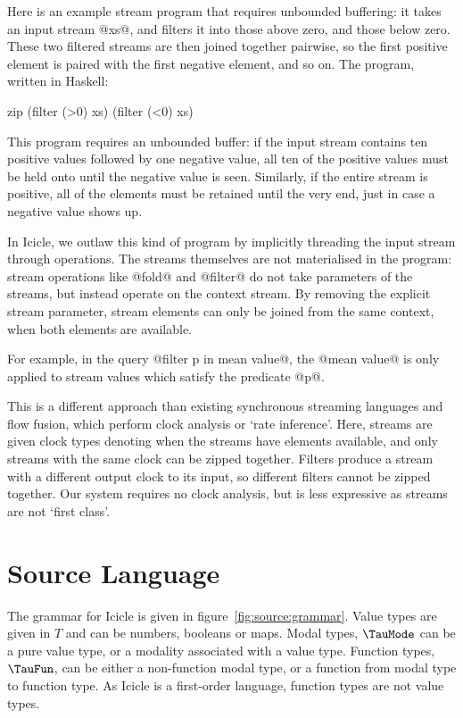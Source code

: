 Here is an example stream program that requires unbounded buffering:
it takes an input stream @xs@, and filters it into those above zero, and those below zero.
These two filtered streams are then joined together pairwise, so the first positive element is paired with the first negative element, and so on.
The program, written in Haskell:

\begin{code}
zip (filter (>0) xs) (filter (<0) xs)
\end{code}

This program requires an unbounded buffer: if the input stream contains ten positive values followed by one negative value, all ten of the positive values must be held onto until the negative value is seen.
Similarly, if the entire stream is positive, all of the elements must be retained until the very end, just in case a negative value shows up.

In Icicle, we outlaw this kind of program by implicitly threading the input stream through operations.
The streams themselves are not materialised in the program: stream operations like @fold@ and @filter@ do not take parameters of the streams, but instead operate on the context stream.
By removing the explicit stream parameter, stream elements can only be joined from the same context, when both elements are available.

For example, in the query @filter p in mean value@, the @mean value@ is only applied to stream values which satisfy the predicate @p@.

This is a different approach than existing synchronous streaming languages\cite{mandel2010lucy} and flow fusion\cite{lippmeier2013data}, which perform clock analysis or `rate inference'.
Here, streams are given clock types denoting when the streams have elements available, and only streams with the same clock can be zipped together.
Filters produce a stream with a different output clock to its input, so different filters cannot be zipped together.
Our system requires no clock analysis, but is less expressive as streams are not `first class'.


\section{Source Language}
\label{s:IcicleSource}





The grammar for Icicle is given in figure~\ref{fig:source:grammar}.
Value types are given in $T$ and can be numbers, booleans or maps.
Modal types, $\TauMode$ can be a pure value type, or a modality associated with a value type.
Function types, $\TauFun$, can be either a non-function modal type, or a function from modal type to function type.
As Icicle is a first-order language, function types are not value types.

